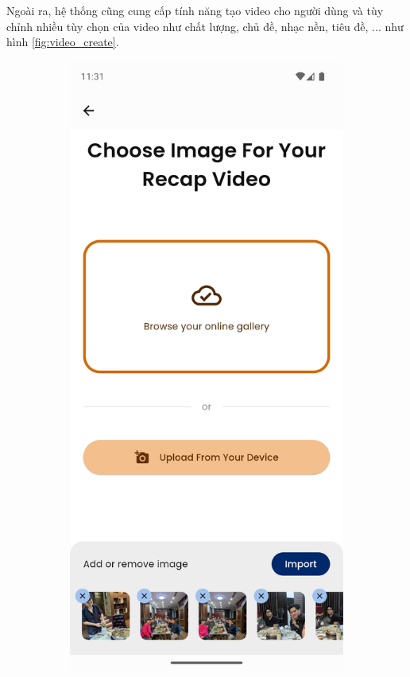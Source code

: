Ngoài ra, hệ thống cũng cung cấp tính năng tạo video cho người dùng và tùy chỉnh nhiều tùy chọn của video như chất lượng, chủ đề, nhạc nền, tiêu đề, ... như hình \ref{fig:video_create}.

\begin{figure}[H]
    \centering
    \begin{subfigure}{0.48\textwidth}
        \includegraphics[width=1\linewidth]{figures/c4/4-2/create_video_1.png} 

\end{subfigure}
\end{figure}
